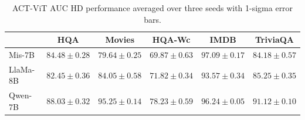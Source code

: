\begin{table}[t]
\centering
\caption{ACT-ViT AUC HD performance averaged over three seeds with 1-sigma error bars.}
\label{tab:seeds}
\renewcommand{\arraystretch}{1.15}
\small
\begin{tabular}{|l|c|c|c|c|c|}
\hline
 & HQA & Movies & HQA-Wc & IMDB & TriviaQA \\
\hline
Mis-7B   & $84.48 \pm 0.28$ & $79.64 \pm 0.25$ & $69.87 \pm 0.63$ & $97.09 \pm 0.17$ & $84.18 \pm 0.57$ \\
\hline
LlaMa-8B & $82.45 \pm 0.36$ & $84.05 \pm 0.58$ & $71.82 \pm 0.34$ & $93.57 \pm 0.34$ & $85.25 \pm 0.35$ \\
\hline
Qwen-7B  & $88.03 \pm 0.32$ & $95.25 \pm 0.14$ & $78.23 \pm 0.59$ & $96.24 \pm 0.05$ & $91.12 \pm 0.10$ \\
\hline
\end{tabular}
\end{table}
